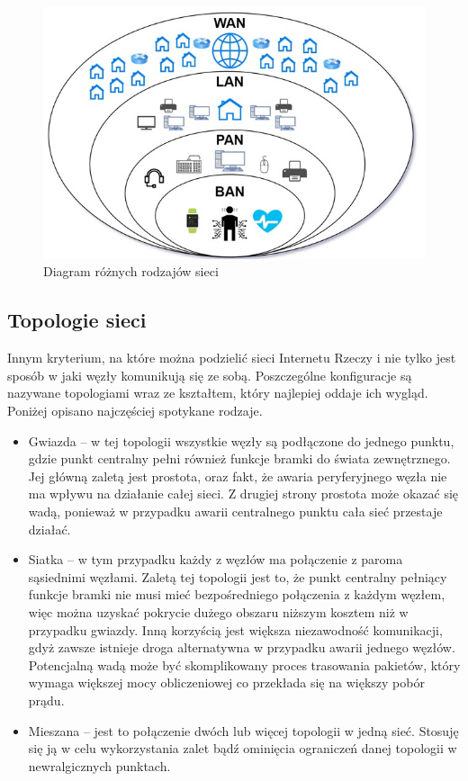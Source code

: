 \documentclass[12pt, twoside, openany]{mwrep}
\begin{document}
\begin{figure}[H]
\centering
\includegraphics[width=\textwidth]{rodzaje_sieci}
\caption{Diagram różnych rodzajów sieci}
\end{figure}

\subsection{Topologie sieci}

Innym kryterium, na które można podzielić sieci Internetu Rzeczy i nie tylko jest sposób w jaki węzły komunikują się ze sobą. Poszczególne konfiguracje są nazywane topologiami wraz ze kształtem, który najlepiej oddaje ich wygląd. Poniżej opisano najczęściej spotykane rodzaje.
\begin{itemize}
    \item Gwiazda – w tej topologii wszystkie węzły są podłączone do jednego punktu, gdzie punkt centralny pełni również funkcje bramki do świata zewnętrznego. Jej główną zaletą jest prostota, oraz fakt, że awaria peryferyjnego węzła nie ma wpływu na działanie całej sieci. Z drugiej strony prostota może okazać się wadą, ponieważ w przypadku awarii centralnego punktu cała sieć przestaje działać.
    \item Siatka – w tym przypadku każdy z węzłów ma połączenie z paroma sąsiednimi węzłami. Zaletą tej topologii jest to, że punkt centralny pełniący funkcje bramki nie musi mieć bezpośredniego połączenia z każdym węzłem, więc można uzyskać pokrycie dużego obszaru niższym kosztem niż w przypadku gwiazdy. Inną korzyścią jest większa niezawodność komunikacji, gdyż zawsze istnieje droga alternatywna w przypadku awarii jednego węzłów. Potencjalną wadą może być skomplikowany proces trasowania pakietów, który wymaga większej mocy obliczeniowej co przekłada się na większy pobór prądu.
    \item Mieszana – jest to połączenie dwóch lub więcej topologii w jedną sieć. Stosuję się ją w celu wykorzystania zalet bądź ominięcia ograniczeń danej topologii w newralgicznych punktach.
\end{itemize}
\end{document}
